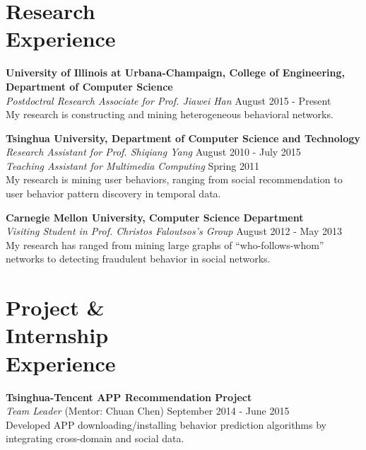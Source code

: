 \documentclass[margin, 10pt]{res} %
\begin{document}
\begin{resume}

\section{Research \\ Experience}

{\bf University of Illinois at Urbana-Champaign, College of Engineering, Department of Computer Science} \\
{\em Postdoctral Research Associate for Prof. Jiawei Han} \hfill {August 2015 - Present} \\
My research is constructing and mining heterogeneous behavioral networks.

{\bf Tsinghua University, Department of Computer Science and Technology} \\
{\em Research Assistant for Prof. Shiqiang Yang} \hfill {August 2010 - July 2015} \\
{\em Teaching Assistant for Multimedia Computing} \hfill {Spring 2011} \\
My research is mining user behaviors, ranging from social recommendation to user behavior pattern discovery in temporal data.

{\bf Carnegie Mellon University, Computer Science Department} \\
{\em Visiting Student in Prof. Christos Faloutsos's Group} \hfill {August 2012 - May 2013} \\
My research has ranged from mining large graphs of ``who-follows-whom'' networks to detecting fraudulent behavior in social networks.


\section{Project \& \\ Internship \\ Experience}

{\bf Tsinghua-Tencent APP Recommendation Project} \\
{\em Team Leader} (Mentor: Chuan Chen) \hfill {September 2014 - June 2015} \\
Developed APP downloading/installing behavior prediction algorithms by integrating cross-domain and social data.


\end{resume}
\end{document}
